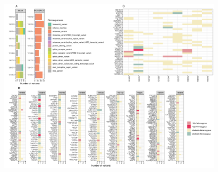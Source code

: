 \documentclass[fleqn,10pt]{wlscirep}
\begin{document}
\begin{figure}[ht]
\centering
\includegraphics[width=\linewidth]{fig/panel_WomenResults.png}
\caption{\textbf{}  }
\label{fig:reswomen}
\end{figure}
\end{document}
